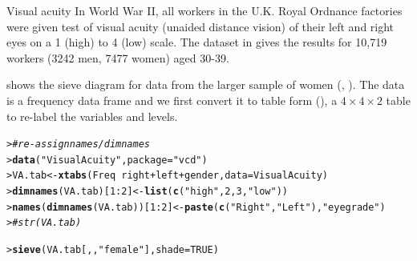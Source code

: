 \documentclass[10pt,krantz2]{krantz}\usepackage[]{graphicx}\usepackage[]{color}
\makeatletter
\newcommand{\hlnum}[1]{\textcolor[rgb]{0.686,0.059,0.569}{#1}}%
\newcommand{\hlstr}[1]{\textcolor[rgb]{0.192,0.494,0.8}{#1}}%
\newcommand{\hlcom}[1]{\textcolor[rgb]{0.678,0.584,0.686}{\textit{#1}}}%
\newcommand{\hlopt}[1]{\textcolor[rgb]{0,0,0}{#1}}%
\newcommand{\hlstd}[1]{\textcolor[rgb]{0.345,0.345,0.345}{#1}}%
\newcommand{\hlkwb}[1]{\textcolor[rgb]{0.69,0.353,0.396}{#1}}%
\newcommand{\hlkwc}[1]{\textcolor[rgb]{0.333,0.667,0.333}{#1}}%
\newcommand{\hlkwd}[1]{\textcolor[rgb]{0.737,0.353,0.396}{\textbf{#1}}}%
\newenvironment{kframe}{%
 \def\at@end@of@kframe{}%
 \ifinner\ifhmode%
  \def\at@end@of@kframe{\end{minipage}}%
  \begin{minipage}{\columnwidth}%
 \fi\fi%
 \def\FrameCommand##1{\hskip\@totalleftmargin \hskip-\fboxsep
 \colorbox{shadecolor}{##1}\hskip-\fboxsep
     \hskip-\linewidth \hskip-\@totalleftmargin \hskip\columnwidth}%
 \MakeFramed {\advance\hsize-\width
   \@totalleftmargin\z@ \linewidth\hsize
   \@setminipage}}%
 {\par\unskip\endMakeFramed%
 \at@end@of@kframe}
\newenvironment{knitrout}{}{} %
\renewenvironment{knitrout}{\small\renewcommand{\baselinestretch}{.85}}{} %
\makeatother
\begin{document}
\begin{Example}[vision1]{Visual acuity}
In World War II, all workers in the U.K. Royal Ordnance factories
were given test of visual acuity (unaided distance vision)
of their left and right eyes
on a 1 (high) to 4 (low) scale.  The dataset 
in  gives the results for 10,719 workers
(3242 men, 7477 women) aged 30-39.

 shows the sieve diagram for data
from the larger sample of women
(\citet[Table 33.5]{KendallStuart:61},
\citet[p. 284]{Bishop-etal:75}).
The  data is a frequency data frame
and we first convert it to table form (),
a $4 \times 4 \times 2$
table to re-label the variables and levels.
\begin{knitrout}
\color{fgcolor}\begin{kframe}
\begin{alltt}
\hlstd{> }\hlcom{# re-assign names/dimnames}
\hlstd{> }\hlkwd{data}\hlstd{(}\hlstr{"VisualAcuity"}\hlstd{,} \hlkwc{package}\hlstd{=}\hlstr{"vcd"}\hlstd{)}
\hlstd{> }\hlstd{VA.tab} \hlkwb{<-} \hlkwd{xtabs}\hlstd{(Freq} \hlopt{~} \hlstd{right} \hlopt{+} \hlstd{left} \hlopt{+} \hlstd{gender,} \hlkwc{data}\hlstd{=VisualAcuity)}
\hlstd{> }\hlkwd{dimnames}\hlstd{(VA.tab)[}\hlnum{1}\hlopt{:}\hlnum{2}\hlstd{]} \hlkwb{<-} \hlkwd{list}\hlstd{(}\hlkwd{c}\hlstd{(}\hlstr{"high"}\hlstd{,} \hlnum{2}\hlstd{,} \hlnum{3}\hlstd{,} \hlstr{"low"}\hlstd{))}
\hlstd{> }\hlkwd{names}\hlstd{(}\hlkwd{dimnames}\hlstd{(VA.tab))[}\hlnum{1}\hlopt{:}\hlnum{2}\hlstd{]} \hlkwb{<-} \hlkwd{paste}\hlstd{(}\hlkwd{c}\hlstd{(}\hlstr{"Right"}\hlstd{,} \hlstr{"Left"}\hlstd{),} \hlstr{"eye grade"}\hlstd{)}
\hlstd{> }\hlcom{#str(VA.tab)}
\end{alltt}
\end{kframe}
\end{knitrout}
\begin{knitrout}
\color{fgcolor}\begin{kframe}
\begin{alltt}
\hlstd{> }\hlkwd{sieve}\hlstd{(VA.tab[,,}\hlstr{"female"}\hlstd{],} \hlkwc{shade}\hlstd{=}\hlnum{TRUE}\hlstd{)}
\end{alltt}
\end{kframe}\begin{figure}[!htbp]


\end{figure}
\end{knitrout}
\end{Example}
\end{document}
